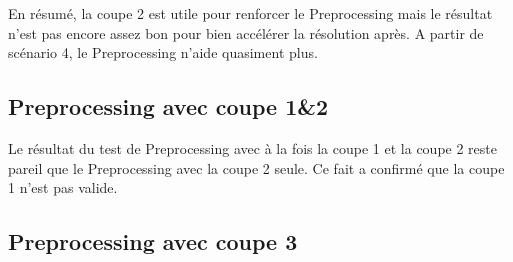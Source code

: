 \documentclass[twoside,fleqn]{EPURapport}
\begin{document}
En résumé, la coupe 2 est utile pour renforcer le Preprocessing mais le résultat n'est pas encore assez bon pour bien accélérer la résolution après. A partir de scénario 4, le Preprocessing n'aide quasiment plus.

\subsection{Preprocessing avec coupe 1\&2}
Le résultat du test de Preprocessing avec à la fois la coupe 1 et la coupe 2 reste pareil que le Preprocessing avec la coupe 2 seule. Ce fait a confirmé que la coupe 1 n'est pas valide.

\subsection{Preprocessing avec coupe 3}
\end{document}
